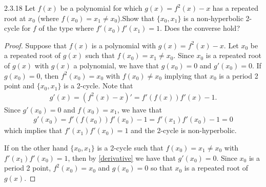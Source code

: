\begin{problem}{2.3.18}
  Let $f(x)$ be a polynomial for which $g(x) = f^2(x) - x$ has a repeated root
  at $x_0$ (where $f(x_0) = x_1 \neq x_0$).Show that
  $\{x_0, x_1\}$ is a non-hyperbolic 2-cycle for $f$ of the type where $f'(x_0)f'(x_1) = 1$. Does
  the converse hold?
\end{problem}

\begin{proof}
  Suppose that $f(x)$ is a polynomial with $g(x) = f^2(x) - x$. Let $x_0$ be a repeated
  root of $g(x)$ such that $f(x_0) = x_1 \neq x_0$. Since $x_0$ is a repeated root of $g(x)$
  with $g(x)$ a polynomial, we have that $g(x_0) = 0$ and $g'(x_0) = 0$. If $g(x_0) = 0$,
  then $f^2(x_0) = x_0$ with $f(x_0) \neq x_0$ implying that $x_0$ is a period 2 point
  and $\{x_0, x_1\}$ is a 2-cycle. Note that
  \begin{align}\label{derivative}
    g'(x) = (f^2(x)-x)' = f'(f(x))f'(x) - 1.
  \end{align}
  Since $g'(x_0) = 0$ and $f(x_0) = x_1$, we have that
  \begin{align*}
    g'(x_0) = f'(f(x_0))f'(x_0) - 1 = f'(x_1)f'(x_0) - 1 = 0
  \end{align*}
  which implies that $f'(x_1)f'(x_0) = 1$ and the 2-cycle is non-hyperbolic.

  If on the other hand $\{x_0, x_1\}$ is a 2-cycle such that $f(x_0) = x_1 \neq x_0$
  with $f'(x_1)f'(x_0) = 1$, then by \eqref{derivative} we have that $g'(x_0) = 0$.
  Since $x_0$ is a period 2 point, $f^2(x_0) = x_0$ and $g(x_0) = 0$ so that $x_0$
  is a repeated root of $g(x)$.
\end{proof}
\newpage
